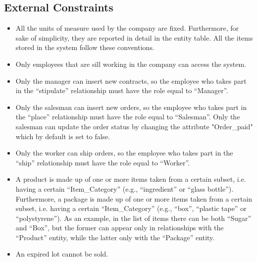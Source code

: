 \subsection{External Constraints}
\begin{itemize}
\item All the units of measure used by the company are fixed. Furthermore, for sake of simplicity, they are reported in detail in the entity table. All the items stored in the system follow these conventions.
\item Only employees that are sill working in the company can access the system.
\item Only the manager can insert new contracts, so the employee who takes part in the ``stipulate'' relationship must have the role equal to ``Manager''.
\item Only the salesman can insert new orders, so the employee who takes part in the ``place'' relationship must have the role equal to ``Salesman''. Only the salesman can update the order status by changing the attribute "Order\_paid" which by default is set to false.
\item Only the worker can ship orders, so the employee who takes part in the ``ship'' relationship must have the role equal to ``Worker''.
\item A product is made up of one or more items taken from a certain subset, i.e. having a certain ``Item\_Category'' (e.g., ``ingredient'' or ``glass bottle''). Furthermore, a package is made up of one or more items taken from a certain subset, i.e. having a certain ``Item\_Category'' (e.g., ``box'', ``plastic tape'' or ``polystyrene''). As an example, in the list of items there can be both ``Sugar'' and ``Box'', but the former can appear only in relationships with the ``Product'' entity, while the latter only with the ``Package'' entity.
\item An expired lot cannot be sold.
\end{itemize}